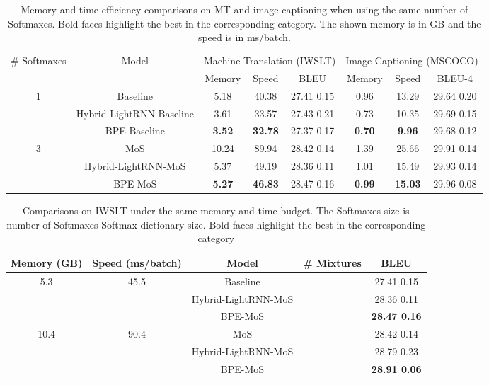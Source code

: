 \documentclass[letterpaper]{article} \usepackage{aaai19}  \usepackage{times}  \usepackage{helvet}  \usepackage{courier}  \usepackage{url}  \usepackage{graphicx}  \frenchspacing  \usepackage{booktabs}
\begin{document}
\begin{table*}
\centering
\small
\begin{tabular}{c|c|ccc|ccc}
\toprule
\multirow{2}{*}{\# Softmaxes} & \multirow{2}{*}{Model} &  \multicolumn{3}{|c|}{Machine Translation (IWSLT)} &\multicolumn{3}{c}{Image Captioning (MSCOCO)} \\
&  & Memory  & Speed  &  BLEU  &  Memory   & Speed & BLEU-4 \\
\midrule
\multirow{3}{*}{1} & Baseline  & 5.18 & 40.38 & 27.41  0.15 &  0.96 & 13.29 & 29.64  0.20 \\
 & Hybrid-LightRNN-Baseline &  3.61 & 33.57 & 27.43  0.21  & 0.73 & 10.35 & 29.69  0.15 \\
 & BPE-Baseline & \textbf{3.52} & \textbf{32.78} &  27.37  0.17 &\textbf{0.70} & \textbf{9.96} &29.68  0.12 \\
\midrule
\multirow{3}{*}{3} & MoS  & 10.24 & 89.94 & 28.42  0.14  &  1.39 & 25.66 & 29.91  0.14\\
 & Hybrid-LightRNN-MoS  & 5.37 & 49.19 & 28.36  0.11  & 1.01 & 15.49 & 29.93  0.14\\
 & BPE-MoS  & \textbf{5.27} & \textbf{46.83} & 28.47  0.16 & \textbf{0.99} & \textbf{15.03} & 29.96  0.08  \\
\bottomrule
\end{tabular}
\caption{Memory and time efficiency comparisons on MT and image captioning when using the same number of Softmaxes. Bold faces highlight the best in the corresponding category. The shown memory is in GB and the speed is in ms/batch.}
\label{tab:same-soft}
\end{table*}

\begin{table*}[ht]
\centering


\small
  \begin{tabular}{cc|cc|c} 
 \toprule
 
Memory (GB) & Speed (ms/batch)&  Model  & \# Mixtures &  BLEU \\  
\midrule
\multirow{3}{*}{5.3} & \multirow{3}{*}{45.5} & Baseline &    & 27.41   0.15 \\
  &  & Hybrid-LightRNN-MoS   &    & 28.36  0.11  \\
  &  & BPE-MoS  &   & \textbf{28.47  0.16}  \\
 \midrule
\multirow{3}{*}{10.4}& \multirow{3}{*}{90.4} &  MoS  &     & 28.42  0.14  \\
  &  &  Hybrid-LightRNN-MoS  &    & 28.79  0.23 \\
  &  &  BPE-MoS  &  &  \textbf{28.91  0.06}  \\
 \bottomrule
\end{tabular}
 \caption{Comparisons on IWSLT under the same memory and time budget. The Softmaxes size is number of Softmaxes  Softmax dictionary size. Bold faces highlight the best in the corresponding category}
 \label{tab:nmt-results}
\end{table*}
\end{document}
